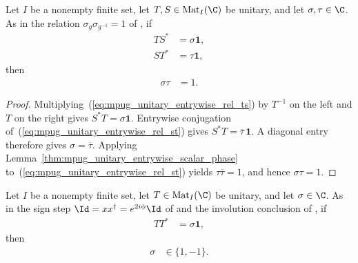 \begin{lemma}
    \label{thm:mpug_unitary_entrywise_paired_scalars}
    \leanok
    Let $I$ be a nonempty finite set, let $T,S\in\operatorname{Mat}_I(\C)$ be
    unitary, and let $\sigma,\tau\in\C$. As in the relation
    $\sigma_g\sigma_{g^{-1}}=1$ of
    \cite[lines~1559--1563]{FrancoRubio2025MPUGauging}, if
    \begin{align}
        TS^* & =\sigma\mathbf 1,
        \label{eq:mpug_unitary_entrywise_rel_ts} \\
        ST^* & =\tau\mathbf 1,
        \label{eq:mpug_unitary_entrywise_rel_st}
    \end{align}
    then
    \begin{align}
        \sigma\tau & =1.
        \label{eq:mpug_unitary_entrywise_paired_scalars}
    \end{align}
\end{lemma}

\begin{proof}\leanok
    Multiplying~(\ref{eq:mpug_unitary_entrywise_rel_ts}) by $T^{-1}$ on the
    left and $T$ on the right gives $S^*T=\sigma\mathbf 1$. Entrywise
    conjugation of~(\ref{eq:mpug_unitary_entrywise_rel_st}) gives
    $S^*T=\overline\tau\,\mathbf 1$. A diagonal entry therefore gives
    $\sigma=\overline\tau$. Applying
    Lemma~\ref{thm:mpug_unitary_entrywise_scalar_phase}
    to~(\ref{eq:mpug_unitary_entrywise_rel_st}) yields $\tau\overline\tau=1$,
    and hence $\sigma\tau=1$.
\end{proof}

\begin{lemma}
    \label{thm:mpug_unitary_entrywise_self_sign}
    \leanok
    Let $I$ be a nonempty finite set, let $T\in\operatorname{Mat}_I(\C)$ be
    unitary, and let $\sigma\in\C$. As in the sign step
    $\Id=xx^\dagger=e^{2i\phi}\Id$ of \cite[lines~1036--1038]{Cirac2017MPU} and
    the involution conclusion of
    \cite[lines~1563--1567]{FrancoRubio2025MPUGauging}, if
    \begin{align}
        TT^* & =\sigma\mathbf 1,
        \label{eq:mpug_unitary_entrywise_self_relation}
    \end{align}
    then
    \begin{align}
        \sigma & \in\{1,-1\}.
        \label{eq:mpug_unitary_entrywise_self_sign}
    \end{align}
\end{lemma}

